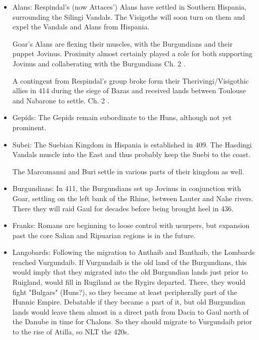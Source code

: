 \documentclass{article}
\newcommand{\specificCite}[1]{\tiny #1 \normalsize}
\begin{document}
\begin{itemize}
		\item Alans:\newline
		Respindal's (now Attaces') Alans have settled in Southern Hispania, surrounding the Silingi Vandals.
		The Visigoths will soon turn on them and expel the Vandals and Alans from Hispania.
		
		Goar's Alans are flexing their muscles, with the Burgundians and their puppet Jovinus.
		Proximity almost certainly played a role for both supporting Jovinus and collaberating with the Burgundians \cite{BachrachAlans}\specificCite{Ch. 2}.
		
		A contingent from Respindal's group broke form their Therivingi/Visigothic allies in 414 during the siege of Bazas and received lands between Toulouse and Nabarone to settle. \cite{BachrachAlans}\specificCite{Ch. 2}.
		
		\item Gepids:\newline
		The Gepids remain subordinate to the Huns, although not yet prominent.
		
		\item Subei:\newline
		The Suebian Kingdom in Hispania is established in 409.
		The Hasdingi Vandals muscle into the East and thus probably keep the Suebi to the coast.
		
		The Marcomanni and Buri settle in various parts of their kingdom as well.
		
		\item Burgundians:\newline
		In 411, the Burgundians set up Jovinus in conjunction with Goar, settling on the left bank of the Rhine, between Lauter and Nahe rivers.
		There they will raid Gaul for decades before being brought heel in 436.
		
		\item Franks:\newline
		Romans are beginning to loose control with usurpers, but expansion past the core Salian and Ripuarian regions is in the future.
		
		\item Langobards:\newline
		Following the migration to Anthaib and Banthaib, the Lombards reached Vurgundaib.
		If Vurgundaib is the old land of the Burgundians, this would imply that they migrated into the old Burgundian lands just prior to Ruigland, would fill in Rugiland as the Rygirs departed.
		There, they would fight "Bulgars" (Huns?), so they became at least peripherally part of the Hunnic Empire.
		Debatable if they became a part of it, but old Burgundian lands would leave them almost in a direct path from Dacia to Gaul north of the Danube in time for Chalons.
		So they should migrate to Vurgundaib prior to the rise of Atilla, so NLT the 420s.
		

\end{itemize}
\end{document}
